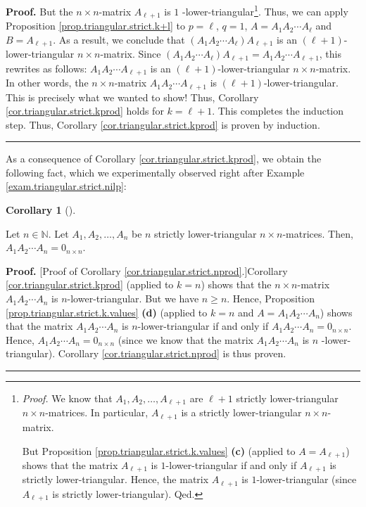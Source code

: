\documentclass[numbers=enddot,12pt,final,onecolumn,notitlepage]{scrartcl}%
\theoremstyle{definition}
\newtheorem{coro}[theo]{Corollary}
\newenvironment{corollary}[1][]
{\begin{coro}[#1]\begin{leftbar}}
{\end{leftbar}\end{coro}}
\newenvironment{proof}[1][Proof]{\noindent\textbf{#1.} }{\ \rule{0.5em}{0.5em}}
\begin{document}
\begin{proof}
But the $n\times n$-matrix $A_{\ell+1}$ is $1$%
-lower-triangular\footnote{\textit{Proof.} We know that $A_{1},A_{2}%
,\ldots,A_{\ell+1}$ are $\ell+1$ strictly lower-triangular $n\times
n$-matrices. In particular, $A_{\ell+1}$ is a strictly lower-triangular
$n\times n$-matrix.
\par
But Proposition \ref{prop.triangular.strict.k.values} \textbf{(c)} (applied to
$A=A_{\ell+1}$) shows that the matrix $A_{\ell+1}$ is $1$-lower-triangular if
and only if $A_{\ell+1}$ is strictly lower-triangular. Hence, the matrix
$A_{\ell+1}$ is $1$-lower-triangular (since $A_{\ell+1}$ is strictly
lower-triangular). Qed.}. Thus, we can apply Proposition
\ref{prop.triangular.strict.k+l} to $p=\ell$, $q=1$, $A=A_{1}A_{2}\cdots
A_{\ell}$ and $B=A_{\ell+1}$. As a result, we conclude that $\left(
A_{1}A_{2}\cdots A_{\ell}\right)  A_{\ell+1}$ is an $\left(  \ell+1\right)
$-lower-triangular $n\times n$-matrix. Since $\left(  A_{1}A_{2}\cdots
A_{\ell}\right)  A_{\ell+1}=A_{1}A_{2}\cdots A_{\ell+1}$, this rewrites as
follows: $A_{1}A_{2}\cdots A_{\ell+1}$ is an $\left(  \ell+1\right)
$-lower-triangular $n\times n$-matrix. In other words, the $n\times n$-matrix
$A_{1}A_{2}\cdots A_{\ell+1}$ is $\left(  \ell+1\right)  $-lower-triangular.
This is precisely what we wanted to show! Thus, Corollary
\ref{cor.triangular.strict.kprod} holds for $k=\ell+1$. This completes the
induction step. Thus, Corollary \ref{cor.triangular.strict.kprod} is proven by induction.
\end{proof}

As a consequence of Corollary \ref{cor.triangular.strict.kprod}, we obtain the
following fact, which we experimentally observed right after Example
\ref{exam.triangular.strict.nilp}:

\begin{corollary}
\label{cor.triangular.strict.nprod}Let $n\in\mathbb{N}$. Let $A_{1}%
,A_{2},\ldots,A_{n}$ be $n$ strictly lower-triangular $n\times n$-matrices.
Then, $A_{1}A_{2}\cdots A_{n}=0_{n\times n}$.
\end{corollary}

\begin{proof}
[Proof of Corollary \ref{cor.triangular.strict.nprod}.]Corollary
\ref{cor.triangular.strict.kprod} (applied to $k=n$) shows that the $n\times
n$-matrix $A_{1}A_{2}\cdots A_{n}$ is $n$-lower-triangular. But we have $n\geq
n$. Hence, Proposition \ref{prop.triangular.strict.k.values} \textbf{(d)}
(applied to $k=n$ and $A=A_{1}A_{2}\cdots A_{n}$) shows that the matrix
$A_{1}A_{2}\cdots A_{n}$ is $n$-lower-triangular if and only if $A_{1}%
A_{2}\cdots A_{n}=0_{n\times n}$. Hence, $A_{1}A_{2}\cdots A_{n}=0_{n\times
n}$ (since we know that the matrix $A_{1}A_{2}\cdots A_{n}$ is $n$%
-lower-triangular). Corollary \ref{cor.triangular.strict.nprod} is thus proven.
\end{proof}
\end{document}
